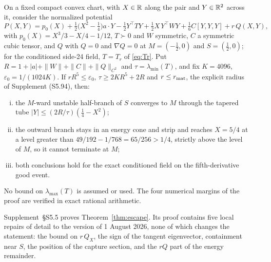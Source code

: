 \begin{theorem}\label{thm:escape}
On a fixed compact convex chart, with $X\in\mathbb R$ along the pair and $Y\in\mathbb R^2$ across it, consider the normalized potential
\begin{equation}\tag{3.18a}
P(X,Y)=p_0(X)+\tfrac12\bigl(X^2-\tfrac14\bigr)a\cdot Y-\tfrac12Y^{\top}TY+\tfrac12X\,Y^{\top}WY+\tfrac16C[Y,Y,Y]+r\,Q(X,Y),
\end{equation}
with $p_0(X)=X^3/3-X/4-1/12$, $T\succ0$ and $W$ symmetric, $C$ a symmetric cubic tensor, and $Q$ with $Q=0$ and $\nabla Q=0$ at $M=(-\tfrac12,0)$ and $S=(\tfrac12,0)$; for the conditioned side-24 field, $T=T_r$ of \eqref{eq:Tr}. Put $R=1+|a|+\|W\|+\|C\|+\|Q\|_{C^2}$ and $\tau=\lambda_{\min}(T)$, and fix $K=4096$, $\varepsilon_0=1/(1024K)$. If $rR^5\le\varepsilon_0$, $\tau\ge2KR^5+2R$ and $r\le r_{\rm mat}$, the explicit radius of Supplement (S5.94), then:
\begin{enumerate}[(i)]
\item the $M$-ward unstable half-branch of $S$ converges to $M$ through the tapered tube $|Y|\le(2R/\tau)(\tfrac14-X^2)$;
\item the outward branch stays in an energy cone and strip and reaches $X=5/4$ at a level greater than $49/192-1/768=65/256>1/4$, strictly above the level of $M$, so it cannot terminate at $M$;
\item both conclusions hold for the exact conditioned field on the fifth-derivative good event.
\end{enumerate}
No bound on $\lambda_{\max}(T)$ is assumed or used. The four numerical margins of the proof are verified in exact rational arithmetic.
\end{theorem}

Supplement~\S S5.5 proves Theorem~\ref{thm:escape}. Its proof contains five local repairs of detail to the version of 1 August 2026, none of which changes the statement: the bound on $r\,Q_X$, the sign of the tangent eigenvector, containment near $S$, the position of the capture section, and the $rQ$ part of the energy remainder.



